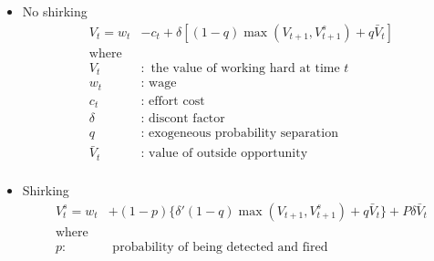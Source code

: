 \documentclass[dvipdfmx, 12pt]{article}
\begin{document}
\begin{itemize}
  \item No shirking
  \begin{align*}
    V_t = w_t &- c_t + \delta [(1 - q)\max(V_{t+1}, V_{t+1}^s) + q \bar{V}_t] \\
    \text{where }& \\
    V_t &: \text{ the value of working hard at time }t \\
    w_t &: \text{ wage} \\
    c_t &: \text{ effort cost} \\
    \delta &: \text{ discont factor} \\
    q &: \text{ exogeneous probability separation} \\
    \bar{V}_t &: \text{ value of outside opportunity} \\
  \end{align*}

  \item Shirking
  \begin{align*}
    V_t^s = w_t &+ (1 - p) \{ \delta' (1 - q) \max (V_{t+1}, V_{t+1}^s) + q \bar{V}_t \} + P \delta \bar{V}_t \\
    \text{where }& \\
    p: & \text{ probability of being detected and fired}
  \end{align*}
\end{itemize}
\end{document}
